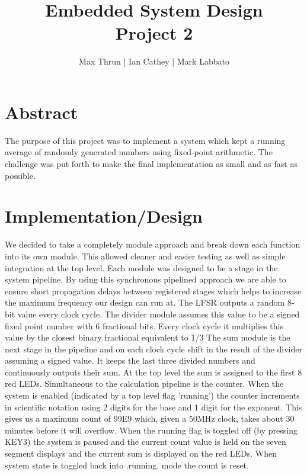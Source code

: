 \documentclass[12pt]{article}
\title{Embedded System Design \\ Project 2}
\author{ Max Thrun | Ian Cathey | Mark Labbato }
\begin{document}
\maketitle


\section*{Abstract}
The purpose of this project was to implement a system which kept a running average of randomly generated numbers using fixed-point arithmetic. The challenge was put forth to make the final implementation as small and as fast as possible.


\section*{Implementation/Design}
We decided to take a completely module approach and break down each function into its own module. This allowed cleaner and easier testing as well as simple integration at the top level. Each module was designed to be a stage in the system pipeline. By using this synchronous pipelined approach we are able to ensure short propagation delays between registered stages which helps to increase the maximum frequency our design can run at. The LFSR outputs a random 8-bit value every clock cycle. The divider module assumes this value to be a signed fixed point number with 6 fractional bits. Every clock cycle it multiplies this value by the closest binary fractional equivalent to 1/3 The sum module is the next stage in the pipeline and on each clock cycle shift in the result of the divider assuming a signed value. It keeps the last three divided numbers and continuously outputs their sum. At the top level the sum is assigned to the first 8 red LEDs. Simultaneous to the calculation pipeline is the counter. When the system is enabled (indicated by a top level flag 'running') the counter increments in scientific notation using 2 digits for the base and 1 digit for the exponent. This gives us a maximum count of 99E9 which, given a 50MHz clock, takes about 30 minutes before it will overflow. When the running flag is toggled off (by pressing KEY3) the system is paused and the current count value is held on the seven segment displays and the current sum is displayed on the red LEDs. When system state is toggled back into .running. mode the count is reset.
\end{document}
